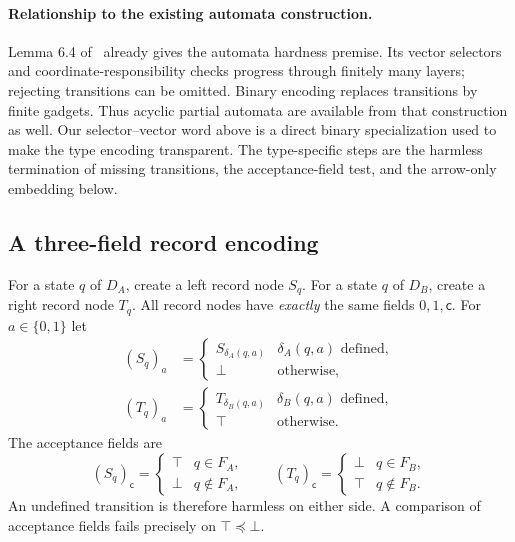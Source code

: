 \documentclass[11pt,letterpaper]{article}
\theoremstyle{definition}\newtheorem{definition}[theorem]{Definition}
\newcommand{\Sub}{\ensuremath{\preceq}}
\newcommand{\bits}{\{0,1\}}
\newcommand{\checkfield}{\mathsf c}
\begin{document}
\paragraph{Relationship to the existing automata construction.}
Lemma 6.4 of~\cite{DDFMW25} already gives the automata hardness premise. Its vector selectors and coordinate-responsibility checks progress through finitely many layers; rejecting transitions can be omitted. Binary encoding replaces transitions by finite gadgets. Thus acyclic partial automata are available from that construction as well. Our selector--vector word above is a direct binary specialization used to make the type encoding transparent. The type-specific steps are the harmless termination of missing transitions, the acceptance-field test, and the arrow-only embedding below.

\subsection{A three-field record encoding}
For a state $q$ of $D_A$, create a left record node $S_q$. For a state $q$ of $D_B$, create a right record node $T_q$. All record nodes have \emph{exactly} the same fields $0,1,\checkfield$. For $a\in\bits$ let
\begin{align*}
(S_q)_a&=\begin{cases}S_{\delta_A(q,a)}&\delta_A(q,a)\text{ defined},\\\bot&\text{otherwise},\end{cases}\\
(T_q)_a&=\begin{cases}T_{\delta_B(q,a)}&\delta_B(q,a)\text{ defined},\\\top&\text{otherwise}.\end{cases}
\end{align*}
The acceptance fields are
\[
(S_q)_{\checkfield}=\begin{cases}\top&q\in F_A,\\\bot&q\notin F_A,\end{cases}\qquad
(T_q)_{\checkfield}=\begin{cases}\bot&q\in F_B,\\\top&q\notin F_B.\end{cases}
\]
An undefined transition is therefore harmless on either side. A comparison of acceptance fields fails precisely on $\top\Sub\bot$.
\end{document}
